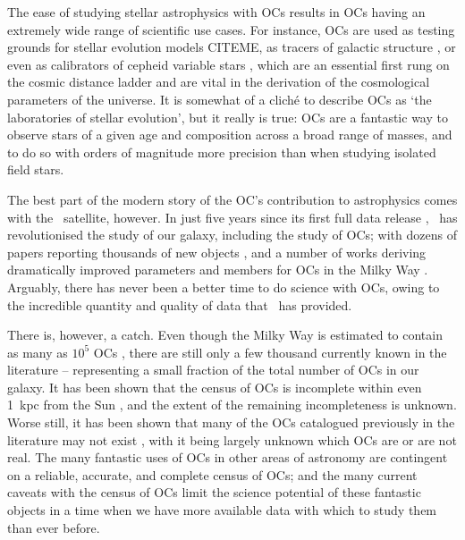The ease of studying stellar astrophysics with OCs results in OCs having an extremely wide range of scientific use cases. For instance, OCs are used as testing grounds for stellar evolution models CITEME, as tracers of galactic structure \citep{cantat-gaudin_painting_2020,castro-ginard_milky_2021}, or even as calibrators of cepheid variable stars \citep{medina_revisited_2021}, which are an essential first rung on the cosmic distance ladder and are vital in the derivation of the cosmological parameters of the universe. It is somewhat of a cliché to describe OCs as `the laboratories of stellar evolution', but it really is true: OCs are a fantastic way to observe stars of a given age and composition across a broad range of masses, and to do so with orders of magnitude more precision than when studying isolated field stars.

The best part of the modern story of the OC's contribution to astrophysics comes with the \gaia\ satellite, however. In just five years since its first full data release \citep{brown_gaia_2018}, \gaia\ has revolutionised the study of our galaxy, including the study of OCs; with dozens of papers reporting thousands of new objects \citep[e.g.][]{liu_catalog_2019,castro-ginard_hunting_2019,castro-ginard_hunting_2020,castro-ginard_hunting_2022}, and a number of works deriving dramatically improved parameters and members for OCs in the Milky Way \citep[e.g.][]{cantat-gaudin_gaia_2018,tarricq_3d_2020}. Arguably, there has never been a better time to do science with OCs, owing to the incredible quantity and quality of data that \gaia\ has provided.

There is, however, a catch. Even though the Milky Way is estimated to contain as many as $10^5$ OCs \citep{dias_new_2002}, there are still only a few thousand currently known in the literature -- representing a small fraction of the total number of OCs in our galaxy. It has been shown that the census of OCs is incomplete within even 1~kpc from the Sun \citep[e.g.][]{castro-ginard_new_2018}, and the extent of the remaining incompleteness is unknown. Worse still, it has been shown that many of the OCs catalogued previously in the literature may not exist \citep{cantat-gaudin_clusters_2020,piatti_catching_2023}, with it being largely unknown which OCs are or are not real. The many fantastic uses of OCs in other areas of astronomy are contingent on a reliable, accurate, and complete census of OCs; and the many current caveats with the census of OCs limit the science potential of these fantastic objects in a time when we have more available data with which to study them than ever before.

